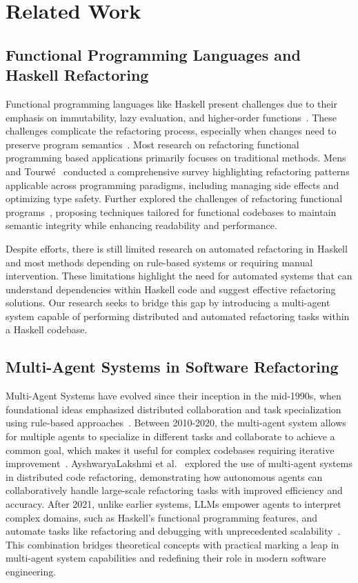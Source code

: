 \section{Related Work}
\label{sec:rw}
\subsection{Functional Programming Languages and Haskell Refactoring}

Functional programming languages like Haskell present challenges due to their emphasis on immutability, lazy evaluation, and higher-order functions~\cite{bragilevsky2021haskell}. These
challenges complicate the refactoring process, especially when changes need to preserve program semantics~\cite{thompson2013refactoring}. Most research on refactoring functional programming based applications primarily focuses on traditional methods. Mens and Tourwé~\cite{mens2004survey} conducted a comprehensive survey highlighting refactoring patterns applicable across programming paradigms, including managing side effects and optimizing type safety. Further explored the challenges of refactoring functional programs~\cite{abdallah2011dynamic}, proposing techniques tailored for functional codebases to maintain semantic integrity while enhancing readability and performance.

Despite efforts, there is still limited research on automated refactoring in Haskell and most methods depending on rule-based systems or requiring manual intervention. These limitations highlight the need for automated systems that can understand dependencies within Haskell code and suggest effective refactoring solutions. Our research seeks to bridge this gap by introducing a multi-agent system capable of performing distributed and automated refactoring tasks within a Haskell codebase.


\subsection{Multi-Agent Systems in Software Refactoring}

Multi-Agent Systems have evolved since their inception in the mid-1990s, when foundational ideas emphasized distributed collaboration and task specialization using rule-based approaches~\cite{wadler1992essence}. Between 2010-2020, the multi-agent system allows for multiple agents to specialize in different tasks and collaborate to achieve a common goal, which makes it useful for complex codebases requiring iterative improvement~\cite{abdallah2011dynamic}. AyshwaryaLakshmi et al.~\cite{ayshwaryalakshmi2013agent} explored the use of multi-agent systems in distributed code refactoring, demonstrating how autonomous agents can collaboratively handle large-scale refactoring tasks with improved efficiency and accuracy. After 2021, unlike earlier systems, LLMs empower agents to interpret complex domains, such as Haskell's functional programming features, and automate tasks like refactoring and debugging with unprecedented scalability~\cite{chen2021evaluating}. This combination bridges theoretical concepts with practical marking a leap in multi-agent system capabilities and redefining their role in modern software engineering.

